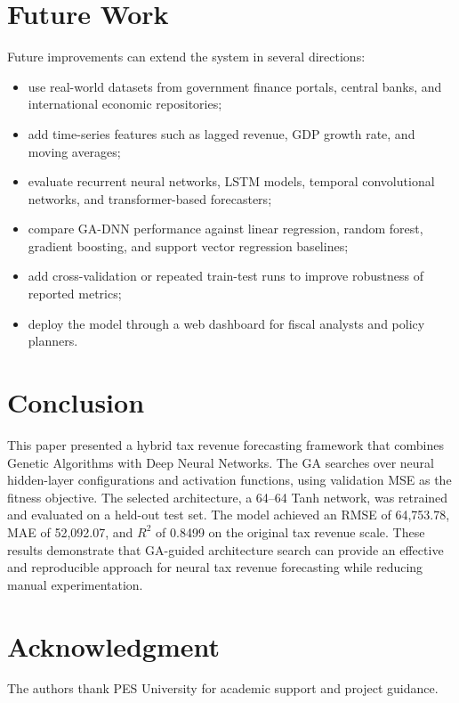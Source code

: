 \documentclass[conference]{IEEEtran}
\begin{document}
\section{Future Work}
Future improvements can extend the system in several directions:
\begin{itemize}
    \item use real-world datasets from government finance portals, central banks, and international economic repositories;
    \item add time-series features such as lagged revenue, GDP growth rate, and moving averages;
    \item evaluate recurrent neural networks, LSTM models, temporal convolutional networks, and transformer-based forecasters;
    \item compare GA-DNN performance against linear regression, random forest, gradient boosting, and support vector regression baselines;
    \item add cross-validation or repeated train-test runs to improve robustness of reported metrics;
    \item deploy the model through a web dashboard for fiscal analysts and policy planners.
\end{itemize}

\section{Conclusion}
This paper presented a hybrid tax revenue forecasting framework that combines Genetic Algorithms with Deep Neural Networks. The GA searches over neural hidden-layer configurations and activation functions, using validation MSE as the fitness objective. The selected architecture, a 64--64 Tanh network, was retrained and evaluated on a held-out test set. The model achieved an RMSE of 64,753.78, MAE of 52,092.07, and $R^{2}$ of 0.8499 on the original tax revenue scale. These results demonstrate that GA-guided architecture search can provide an effective and reproducible approach for neural tax revenue forecasting while reducing manual experimentation.

\section*{Acknowledgment}
The authors thank PES University for academic support and project guidance.
\end{document}
